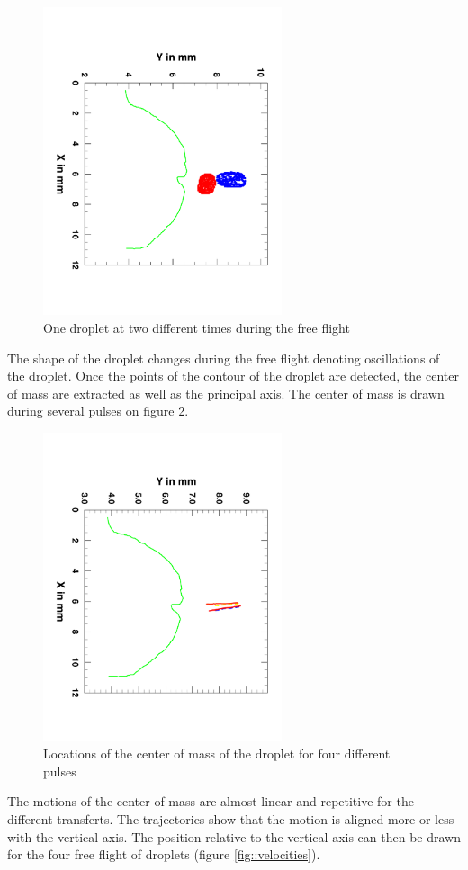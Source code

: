 \documentclass[12pt]{iopart}
\begin{document}
\begin{figure}[h!]
\centering    
\includegraphics[width=7cm,angle=90]{images/FreeFlight.pdf}
\caption{One droplet at two different times during the free flight}
\label{fig::droplets}
\end{figure}

The shape of the droplet changes during the free flight denoting oscillations of the droplet.
Once the points of the contour of the droplet are detected, the center of mass are extracted  as well as the principal axis.
The center of mass is drawn during several pulses on figure \ref{fig::center_mass}.

\begin{figure}[h!]
\centering    
\includegraphics[width=7cm,angle=90]{images/Trajectory.pdf}
\caption{Locations of the center of mass of the droplet for four different pulses}
\label{fig::center_mass}
\end{figure}
The motions of the center of mass are almost linear and repetitive for the different transferts.
The trajectories show that the motion is aligned more or less with the vertical axis.
The position relative to the vertical axis can then be drawn for the four free 
flight of droplets (figure \ref{fig::velocities}).
 
\end{document}
